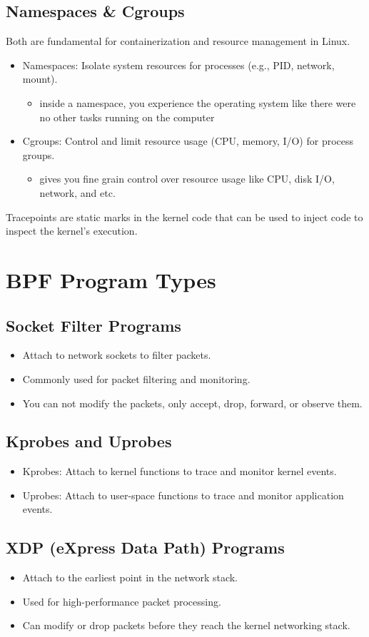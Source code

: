 \documentclass[a4paper,12pt]{article}
\begin{document}
\subsection{Namespaces \& Cgroups}
Both are fundamental for containerization and resource management in Linux. 
\begin{itemize}
    \item Namespaces: Isolate system resources for processes (e.g., PID, network, mount).
    \begin{itemize}
        \item inside a namespace, you experience the operating system like there were no other tasks running on the computer
    \end{itemize}
    \item Cgroups: Control and limit resource usage (CPU, memory, I/O) for process groups.
    \begin{itemize}
        \item gives you fine grain control over resource usage like CPU, disk I/O, network, and etc.
    \end{itemize}
\end{itemize}

Tracepoints are static marks in the kernel code that can be used to inject code to inspect the kernel's execution.

\section{BPF Program Types}

\subsection{Socket Filter Programs}
\begin{itemize}
    \item Attach to network sockets to filter packets.
    \item Commonly used for packet filtering and monitoring.
    \item You can not modify the packets, only accept, drop, forward, or observe them.
\end{itemize}

\subsection{Kprobes and Uprobes}
\begin{itemize}
    \item Kprobes: Attach to kernel functions to trace and monitor kernel events.
    \item Uprobes: Attach to user-space functions to trace and monitor application events.
\end{itemize}

\subsection{XDP (eXpress Data Path) Programs}
\begin{itemize}
    \item Attach to the earliest point in the network stack.
    \item Used for high-performance packet processing.
    \item Can modify or drop packets before they reach the kernel networking stack.
\end{itemize}
\end{document}
